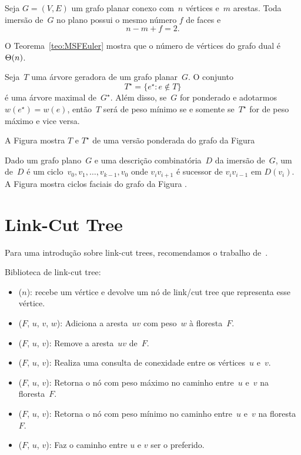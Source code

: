 
\begin{theorem}
\label{teo:MSFEuler}
Seja $G=(V,E)$ um grafo planar conexo com~$n$ vértices e~$m$ arestas. Toda imersão de~$G$ no plano possui o mesmo número $f$ de faces e
$$
n-m+f = 2.
$$
\end{theorem}

O Teorema~\ref{teo:MSFEuler} mostra que o número de vértices do grafo dual é $\Theta(n)$.

\begin{theorem}
\label{teo:MSFdual}
Seja~$T$ uma árvore geradora de um grafo planar~$G$. O conjunto
$$
T^\star = \{e^\star:e\notin T\}
$$
é uma árvore maximal de~$G^\star$.
Além disso, se~$G$ for ponderado e adotarmos $w(e^\star) = w(e)$, então~$T$ será de peso mínimo se e somente se~$T^\star$ for de peso máximo e vice versa.
\end{theorem}

A Figura  mostra $T$ e $T^\star$ de uma versão ponderada do grafo da Figura 


Dado um grafo plano~$G$ e uma descrição combinatória~$D$ da imersão de~$G$, um  de~$D$ é um ciclo~$v_0,v_1,\ldots,v_{k-1},v_0$ onde $v_iv_{i+1}$ é sucessor de $v_iv_{i-1}$ em $D(v_i)$. A Figura  mostra ciclos faciais do grafo da Figura .

\section{Link-Cut Tree}
\label{sec:linkcuttree}

Para uma introdução sobre link-cut trees, recomendamos o trabalho de~\cite{linkcuttree}.

Biblioteca de link-cut tree:
\begin{itemize}
\item \linkcutCreate($n$): recebe um vértice e devolve um nó de link/cut tree que representa esse vértice.
\item \linkcutAddEdge($F$, $u$, $v$, $w$): Adiciona a aresta~$uv$ com peso~$w$ à floresta~$F$.
\item \linkcutDelEdge($F$, $u$, $v$): Remove a aresta~$uv$ de~$F$.
\item \linkcutQuery($F$, $u$, $v$): Realiza uma consulta de conexidade entre os vértices~$u$ e~$v$.
\item \linkcutMax($F$, $u$, $v$): Retorna o nó com peso máximo no caminho entre~$u$ e~$v$ na floresta~$F$.
\item \linkcutMin($F$, $u$, $v$): Retorna o nó com peso mínimo no caminho entre~$u$ e~$v$ na floresta~$F$.
\item \linkcutPath($F$, $u$, $v$): Faz o caminho entre $u$ e $v$ ser o preferido.
\end{itemize}

